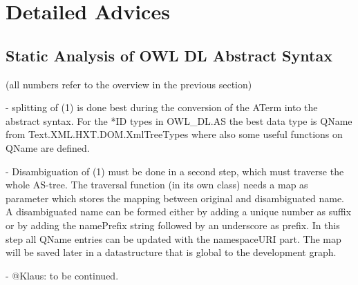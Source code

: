 \documentclass[11pt,a4paper]{article}
\begin{document}
\section{Detailed Advices}

\subsection{Static Analysis of OWL DL Abstract Syntax}

(all numbers refer to the overview in the previous section)


- splitting of (1) is done best during the conversion of the ATerm
  into the abstract syntax. For the *ID types in OWL\_DL.AS the best
  data type is QName from Text.XML.HXT.DOM.XmlTreeTypes where also
  some useful functions on QName are defined.

- Disambiguation of (1) must be done in a second step, which must
  traverse the whole AS-tree. The traversal function (in its own
  class) needs a map as parameter which stores the mapping between
  original and disambiguated name. A disambiguated name can be formed
  either by adding a unique number as suffix or by adding the
  namePrefix string followed by an underscore as prefix.  In this step
  all QName entries can be updated with the namespaceURI part.
  The map will be saved later in a datastructure that is global to the
  development graph.

- @Klaus: to be continued. 
\end{document}
